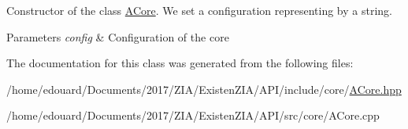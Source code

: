 Constructor of the class \mbox{\hyperlink{classxzia_1_1ACore}{A\+Core}}. We set a configuration representing by a string. 


\begin{DoxyParams}{Parameters}
{\em config} & Configuration of the core \\
\hline
\end{DoxyParams}


The documentation for this class was generated from the following files\+:\begin{DoxyCompactItemize}
\item 
/home/edouard/\+Documents/2017/\+Z\+I\+A/\+Existen\+Z\+I\+A/\+A\+P\+I/include/core/\mbox{\hyperlink{ACore_8hpp}{A\+Core.\+hpp}}\item 
/home/edouard/\+Documents/2017/\+Z\+I\+A/\+Existen\+Z\+I\+A/\+A\+P\+I/src/core/A\+Core.\+cpp\end{DoxyCompactItemize}
